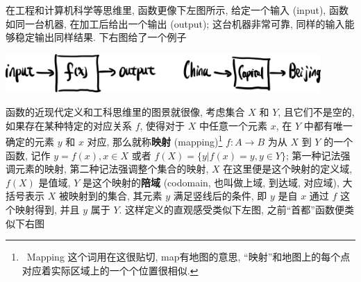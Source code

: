 \begin{tcolorbox}[size=fbox, breakable, enhanced jigsaw, title={函数 (function)}]
\begin{tcolorbox}[size=fbox, breakable, enhanced jigsaw]
\end{tcolorbox}

在工程和计算机科学等思维里, 函数更像下左图所示, 给定一个输入 (input),
函数如同一台机器, 在加工后给出一个输出 (output); 这台机器非常可靠,
同样的输入能够稳定输出同样结果. 下右图给了一个例子

\begin{tcolorbox}[size=fbox, breakable, enhanced jigsaw]
\begin{center}
\includegraphics[width=0.9\textwidth]{img/image-20230228095405809.png}
\end{center}

\end{tcolorbox}

函数的近现代定义和工科思维里的图景就很像, 考虑集合 $X$ 和 $Y$,
且它们不是空的, 如果存在某种特定的对应关系 $f$, 使得对于 $X$
中任意一个元素 $x$, 在 $Y$ 中都有唯一确定的元素 $y$ 和 $x$ 对应,
那么就称\textbf{映射} (mapping)\footnote{~Mapping 这个词用在这很贴切,
  map有地图的意思,
  ``映射''和地图上的每个点对应着实际区域上的一个个位置很相似.}
$f: A\rightarrow B$ 为从 $X$ 到 $Y$ 的一个函数, 记作
$y=f(x), x\in X$ 或者 $f(X)=\{y|f(x)=y, y\in Y\}$;
第一种记法强调元素的映射, 第二种记法强调整个集合的映射, $X$
在这里便是这个映射的定义域, $f(X)$ 是值域, $Y$
是这个映射的\textbf{陪域} (codomain, 也叫做上域, 到达域, 对应域),
大括号表示 $X$ 被映射到的集合, 其元素 $y$ 满足竖线后的条件, 即 $y$
是自 $x$ 通过 $f$ 这个映射得到, 并且 $y$ 属于 $Y$.
这样定义的直观感受类似下左图, 之前``首都''函数便类似下右图


\end{tcolorbox}
